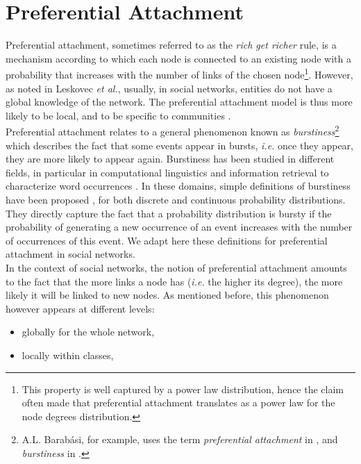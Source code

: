 \section{Preferential Attachment}
Preferential attachment, sometimes referred to as the \textit{rich get richer} rule, is a mechanism according to which each node is connected to an existing node with a probability that increases with the number of links of the chosen node\footnote{This property is well captured by a power law distribution, hence the claim often made that preferential attachment translates as a power law for the node degrees distribution.}. However, as noted in Leskovec \textit{et al.}, usually, in social networks, entities do not have a global knowledge of the network. The preferential attachment model is thus more likely to be local, and to be specific to communities \cite{LeskovecBKT08}.~\\

Preferential attachment relates to a general phenomenon known as \textit{burstiness}\footnote{A.L. Barab\'asi, for example, uses the term \textit{preferential attachment} in \cite{barabasi1999emergence}, and \textit{burstiness} in \cite{barabasi_burst}.} which describes the fact that some events appear in bursts, \textit{i.e.} once they appear, they are more likely to appear again. Burstiness has been studied in different fields, in particular in computational linguistics and information retrieval to characterize word occurrences \cite{church1995poisson}. In these domains, simple definitions of burstiness have been proposed \cite{clinchant2008bnb,clinchant2010information}, for both discrete and continuous probability distributions. They directly capture the fact that a probability distribution is bursty if the probability of generating a new occurrence of an event increases with the number of occurrences of this event. We adapt here these definitions for preferential attachment in social networks.~\\

In the context of social networks, the notion of preferential attachment amounts to the fact that the more links a node has (\textit{i.e.} the higher its degree), the more likely it will be linked to new nodes. As mentioned before, this phenomenon however appears at different levels: 
\begin{itemize}
    \item globally for the whole network,
    \item locally within classes,
\end{itemize}

